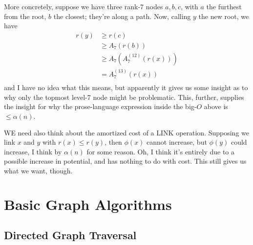 \documentclass{article}
\begin{document}
More concretely, suppose we have three rank-7 nodes $a,b,c$, with 
$a$ the furthest from the root, $b$ the closest; they're along a path.
Now, calling $y$ the new root, we have
\begin{align*}
	r(y) &\geq r(c) \\
&	\geq A_7(r(b)) \\
	&\geq A_7(A_7^{(12)}(r(x))) \\
	&= A_7^{(13)}(r(x)) \\
\end{align*}
and I have no idea what this means, but apparently it gives us some
insight as to why only the topmost level-7 node might be problematic.
This, further, supplies the insight for why the prose-language expression
inside the big-$O$ above is $\leq\alpha(n)$.

WE need also think about the amortized cost of a LINK operation.
Supposing we link $x$ and $y$ with $r(x) \leq r(y)$, then $\phi(x)$ cannot
increase, but $\phi(y)$ could increase, I think by $\alpha(n)$ for some
reason.
Oh, I think it's entirely due to a possible increase in potential, and has
nothing to do with cost.
This still gives us what we want, though.



\section{Basic Graph Algorithms}

\subsection{Directed Graph Traversal}
\end{document}

